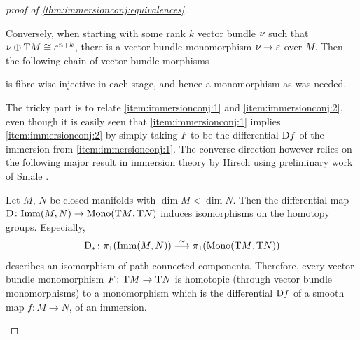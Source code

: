 \begin{proof}[proof of \autoref{thm:immersionconj:equivalences}]
\begin{description}
    Conversely, when starting with some rank $k$ vector bundle $\nu_{}$
    such that $\nu_{}\oplus\mathrm{T}M\cong\varepsilon^{n+k}$, there is a vector
    bundle monomorphism $\nu_{}\to\varepsilon$ over $M$. Then the
    following chain of vector bundle morphisms
    \begin{center}
    \end{center}
    is fibre-wise injective in each stage, and hence a monomorphism as
    was needed.
  \item[\ref{item:immersionconj:1}$\Leftrightarrow$\ref{item:immersionconj:2}:]
    The tricky part is to relate \ref{item:immersionconj:1} and
    \ref{item:immersionconj:2}, even though it is easily seen that
    \ref{item:immersionconj:1} implies \ref{item:immersionconj:2} by
    simply taking $F$ to be the differential $\mathrm{D} f$ of the
    immersion from \ref{item:immersionconj:1}.
    The converse direction however relies on the following major
    result in immersion theory by Hirsch using preliminary work 
    of Smale
    \cite[Sections~5 and 6]{hirschimmersions}.
    \begin{Thm}
      Let $M$, $N$ be closed manifolds with $\dim M<\dim N$.
      Then the differential map
      $\mathrm{D}\colon \mathrm{Imm}({M},{N})\to \mathrm{Mono}({\mathrm{T}M},{\mathrm{T}N})$
      induces isomorphisms on the homotopy groups.
      Especially,
      \begin{gather*}
        \mathrm{D}_*\colon
        \pi_1(\mathrm{Imm}({M},{N})) \overset\sim{\longrightarrow} \pi_1(\mathrm{Mono}({\mathrm{T}M},{\mathrm{T}N}))
      \end{gather*}
      describes an isomorphism of path-connected components.
      Therefore, every vector bundle monomorphism
      $F\colon\mathrm{T}M\to\mathrm{T}N$ is homotopic (through vector bundle
      monomorphisms) to a monomorphism which is the differential
      $\mathrm{D} f$ of a smooth map $f\colon M\to N$, \idest of an
      immersion.
    \end{Thm}

\end{description}
\end{proof}
